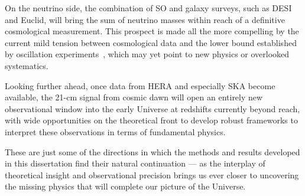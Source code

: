 On the neutrino side, the combination of SO and galaxy surveys, such as DESI and Euclid, will bring the sum of neutrino masses within reach of a definitive cosmological measurement. This prospect is made all the more compelling by the current mild tension between cosmological data and the lower bound established by oscillation experiments~\cite{Craig:2016lyx,Green:2024xbb,Loverde:2024nfi,Lynch:2025ine}, which may yet point to new physics or overlooked systematics. 

Looking further ahead, once data from HERA and especially SKA become available, the 21-cm signal from cosmic dawn will open an entirely new observational window into the early Universe at redshifts currently beyond reach, with wide opportunities on the theoretical front to develop robust frameworks to interpret these observations in terms of fundamental physics.

These are just some of the directions in which the methods and results developed in this dissertation find their natural continuation --- as the interplay of theoretical insight and observational precision brings us ever closer to uncovering the missing physics that will complete our picture of the Universe.